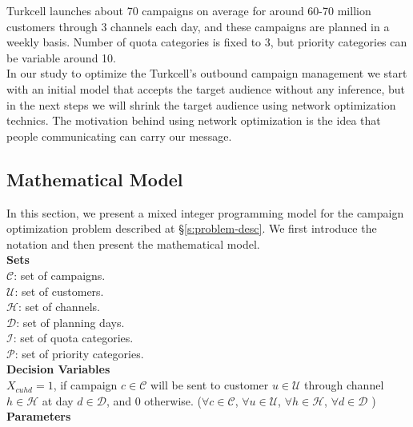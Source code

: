 \documentclass[11pt]{article}
\begin{document}
Turkcell launches about 70 campaigns on average for around 60-70 million customers through 3 channels each day, and these campaigns are planned in a weekly basis. Number of quota categories is fixed to 3, but priority categories can be variable around 10.\\

In our study to optimize the Turkcell’s outbound campaign management we start with an initial model that accepts the target audience without any inference, but in the next steps we will shrink the target audience using network optimization technics. The motivation behind using network optimization is the idea that people communicating can carry our message.

\subsection{Mathematical Model} \label{s:problem-math}

In this section, we present a mixed integer programming model for the campaign optimization problem described at \S \ref{s:problem-desc}. We first introduce the notation and then present the mathematical model.\\

\noindent \textbf{Sets}\\

\noindent ${\mathcal{C}}$: set of campaigns. \\
\noindent ${\mathcal{U}}$: set of customers. \\
\noindent ${\mathcal{H}}$: set of channels. \\
\noindent ${\mathcal{D}}$: set of planning days. \\
\noindent ${\mathcal{I}}$: set of quota categories. \\
\noindent ${\mathcal{P}}$: set of priority categories. \\


\noindent \textbf{Decision Variables}\\

\noindent $X_{{c}{u}{h}{d}}=1$, if campaign $c \in \mathcal{C}$ will be sent to customer $u \in \mathcal{U}$ through channel $h \in \mathcal{H}$ at day $d \in \mathcal{D}$, and 0 otherwise.
($\forall c \in \mathcal{C}$, $\forall u \in \mathcal{U}$, $\forall h \in \mathcal{H}$, $\forall d \in \mathcal{D}$ )\\

\noindent \textbf{Parameters}\\
\end{document}
